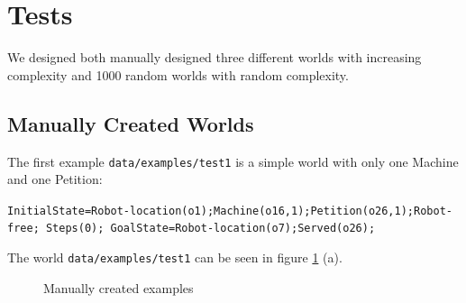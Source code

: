 \section{Tests}

We designed both manually designed three different worlds with increasing complexity and 1000 random worlds with random complexity.

\subsection{Manually Created Worlds}

The first example \texttt{data/examples/test1} is a simple world with only one Machine and one Petition:

\texttt{InitialState=Robot-location(o1);Machine(o16,1);Petition(o26,1);Robot-free; Steps(0);
GoalState=Robot-location(o7);Served(o26);}

The world \texttt{data/examples/test1} can be seen in figure \ref{fig:manworlds} (a).

\begin{figure}[!ht]
\centering     %
{}
\caption{Manually created examples}
\label{fig:manworlds}
\end{figure}

